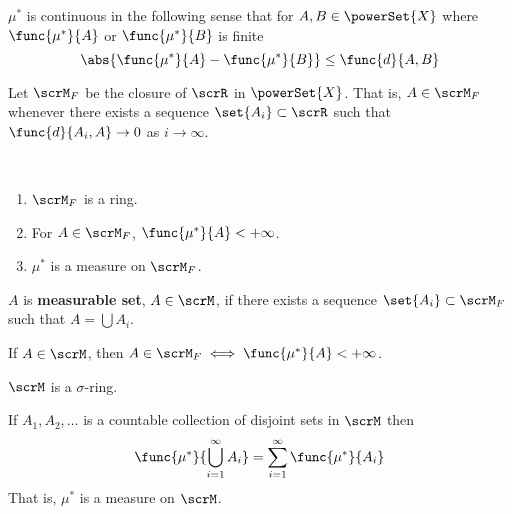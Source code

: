 \begin{proposition}
    \(\mu^{\ast}\) is continuous in the following sense that for \(A,B \in \powerSet{X}\) where  \(\func{\mu^{\ast}}{A}\) or \(\func{\mu^{\ast}}{B}\) is finite 
    \begin{equation*}
        \abs{\func{\mu^{\ast}}{A} - \func{\mu^{\ast}}{B}} \leq \func{d}{A,B}
    \end{equation*}
\end{proposition}

\begin{definition}
    Let \(\scrM_F\) be the closure of \(\scrR\) in \(\powerSet{X}\). That is, \(A \in \scrM_F\) whenever there exists a sequence \(\set{A_i} \subset \scrR\) such that \(\func{d}{A_i,A} \to 0\) as \(i \to \infty\).
\end{definition}

\begin{theorem}
    \ 
    \begin{enumerate}
        \item \(\scrM_F\) is a ring.
        \item For \(A \in \scrM_F\), \(\func{\mu^{\ast}}{A} < + \infty\).
        \item \(\mu^{\ast}\) is a measure on \(\scrM_F\).
    \end{enumerate}
\end{theorem}

\begin{definition}
    \(A\) is \textbf{measurable set}, \(A \in \scrM\), if there exists a sequence \(\set{A_i} \subset \scrM_F\) such that \(A = \bigcup A_i\).
\end{definition}

\begin{theorem}
    If \(A \in \scrM\), then \(A \in \scrM_F \iff \func{\mu^{\ast}}{A} < + \infty\).
\end{theorem}


\begin{theorem}
    \(\scrM\) is a \(\sigma\)-ring.
\end{theorem}

\begin{theorem}
    If \(A_1,A_2, \dots \) is a countable collection of disjoint sets in \(\scrM\) then 
    \begin{equation*}
        \func{\mu^{\ast}}{\bigcup_{i = 1}^{\infty} A_i} = \sum_{i = 1}^{\infty} \func{\mu^{\ast}}{A_i}
    \end{equation*}
    That is, \(\mu^{\ast}\) is a measure on \(\scrM\).
\end{theorem}

